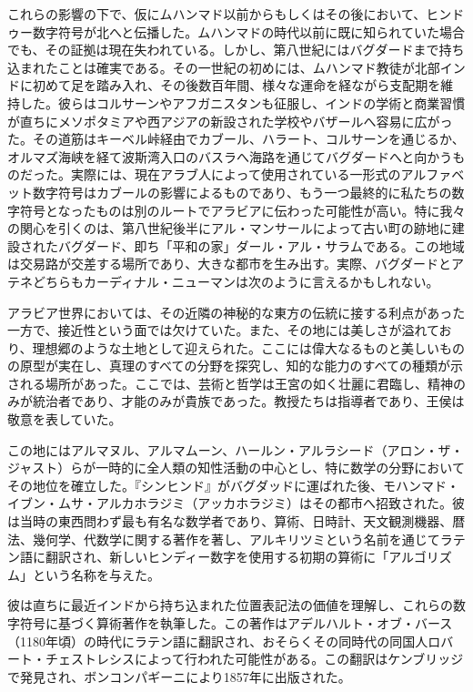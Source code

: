 \documentclass[a4paper,11pt,openany]{ltjsbook}
\begin{document}
これらの影響の下で、仮にムハンマド以前からもしくはその後において、ヒンドゥー数字符号が北へと伝播した。ムハンマドの時代以前に既に知られていた場合でも、その証拠は現在失われている。しかし、第八世紀にはバグダードまで持ち込まれたことは確実である。その一世紀の初めには、ムハンマド教徒が北部インドに初めて足を踏み入れ、その後数百年間、様々な運命を経ながら支配期を維持した。彼らはコルサーンやアフガニスタンも征服し、インドの学術と商業習慣が直ちにメソポタミアや西アジアの新設された学校やバザールへ容易に広がった。その道筋はキーベル峠経由でカブール、ハラート、コルサーンを通じるか、オルマズ海峡を経て波斯湾入口のバスラへ海路を通じてバグダードへと向かうものだった。実際には、現在アラブ人によって使用されている一形式のアルファベット数字符号はカブールの影響によるものであり、もう一つ最終的に私たちの数字符号となったものは別のルートでアラビアに伝わった可能性が高い。特に我々の関心を引くのは、第八世紀後半にアル・マンサールによって古い町の跡地に建設されたバグダード、即ち「平和の家」ダール・アル・サラムである。この地域は交易路が交差する場所であり、大きな都市を生み出す。実際、バグダードとアテネどちらもカーディナル・ニューマンは次のように言えるかもしれない。

アラビア世界においては、その近隣の神秘的な東方の伝統に接する利点があった一方で、接近性という面では欠けていた。また、その地には美しさが溢れており、理想郷のような土地として迎えられた。ここには偉大なるものと美しいものの原型が実在し、真理のすべての分野を探究し、知的な能力のすべての種類が示される場所があった。ここでは、芸術と哲学は王宮の如く壮麗に君臨し、精神のみが統治者であり、才能のみが貴族であった。教授たちは指導者であり、王侯は敬意を表していた。

この地にはアルマヌル、アルマムーン、ハールン・アルラシード（アロン・ザ・ジャスト）らが一時的に全人類の知性活動の中心とし、特に数学の分野においてその地位を確立した。『シンヒンド』がバグダッドに運ばれた後、モハンマド・イブン・ムサ・アルカホラジミ（アッカホラジミ）はその都市へ招致された。彼は当時の東西問わず最も有名な数学者であり、算術、日時計、天文観測機器、暦法、幾何学、代数学に関する著作を著し、アルキリツミという名前を通じてラテン語に翻訳され、新しいヒンディー数字を使用する初期の算術に「アルゴリズム」という名称を与えた。

彼は直ちに最近インドから持ち込まれた位置表記法の価値を理解し、これらの数字符号に基づく算術著作を執筆した。この著作はアデルハルト・オブ・バース（1180年頃）の時代にラテン語に翻訳され、おそらくその同時代の同国人ロバート・チェストレシスによって行われた可能性がある。この翻訳はケンブリッジで発見され、ボンコンパギーニにより1857年に出版された。
\end{document}
